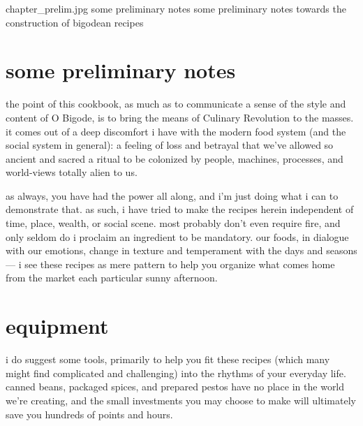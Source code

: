 \mychapter
{chapter_prelim.jpg}
{some preliminary notes}
{some preliminary notes towards the construction of bigodean recipes}

\section{some preliminary notes}

the point of this cookbook, as much as to communicate a sense of the
style and content of O Bigode, is to bring the means of Culinary
Revolution to the masses. it comes out of a deep discomfort i have
with the modern food system (and the social system in general): a
feeling of loss and betrayal that we've allowed so ancient and sacred
a ritual to be colonized by people, machines, processes, and
world-views totally alien to us.

as always, you have had the power all along, and i'm just doing what i
can to demonstrate that. as such, i have tried to make the recipes
herein independent of time, place, wealth, or social scene. most
probably don't even require fire, and only seldom do i proclaim an
ingredient to be mandatory.  our foods, in dialogue with our emotions,
change in texture and temperament with the days and seasons --- i see
these recipes as mere pattern to help you organize what comes home
from the market each particular sunny afternoon.
  
\section{equipment}

i do suggest some tools, primarily to help you fit these recipes
(which many might find complicated and challenging) into the rhythms
of your everyday life. canned beans, packaged spices, and prepared
pestos have no place in the world we're creating, and the small
investments you may choose to make will ultimately save you hundreds
of points and hours.

